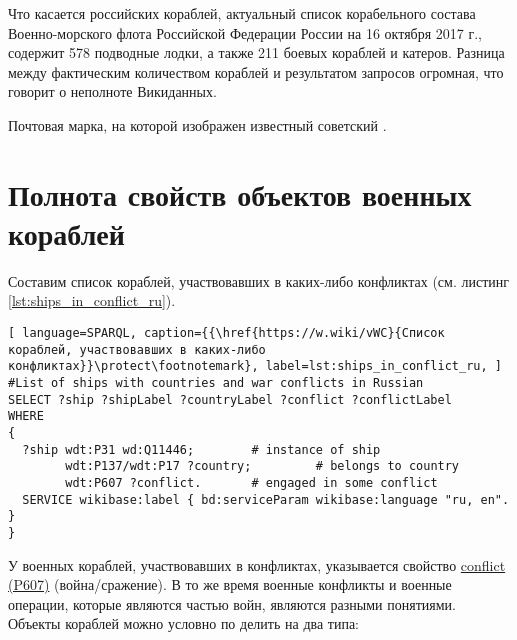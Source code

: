 Что касается российских кораблей, актуальный список корабельного состава Военно-морского флота Российской Федерации России на 16 октября 2017 г., содержит \num{578} подводные лодки, а также 211 боевых кораблей и катеров\cite{RussianShips}. Разница между фактическим количеством кораблей и результатом запросов огромная, что говорит о неполноте Викиданных.

\begin{marginfigure}[0.0cm]
  {
    \setlength{\fboxsep}{0pt}%
    \setlength{\fboxrule}{1pt}%
  }
  \caption[Известный советский миноносец.]{Почтовая марка, на которой изображен известный советский  .}%
  \label{fig:grem_question}%
\end{marginfigure}

\label{question:ship_2}


\section{Полнота свойств объектов военных кораблей}

Составим список кораблей, участвовавших в каких-либо конфликтах (см. листинг \ref{lst:ships_in_conflict_ru}).

\begin{lstlisting}[ language=SPARQL, caption={{\href{https://w.wiki/vWC}{Список кораблей, участвовавших в каких-либо конфликтах}}\protect\footnotemark}, label=lst:ships_in_conflict_ru, ]
#List of ships with countries and war conflicts in Russian
SELECT ?ship ?shipLabel ?countryLabel ?conflict ?conflictLabel
WHERE
{
  ?ship wdt:P31 wd:Q11446;        # instance of ship
        wdt:P137/wdt:P17 ?country;         # belongs to country
        wdt:P607 ?conflict.       # engaged in some conflict
  SERVICE wikibase:label { bd:serviceParam wikibase:language "ru, en". }
}
\end{lstlisting}

У военных кораблей, участвовавших в конфликтах, указывается свойство \href{https://www.wikidata.org/wiki/Property:P607}{conflict (P607)} (война/сражение). В то же время военные конфликты и военные операции, которые являются частью войн, являются разными понятиями. Объекты кораблей можно условно по делить на два типа:

